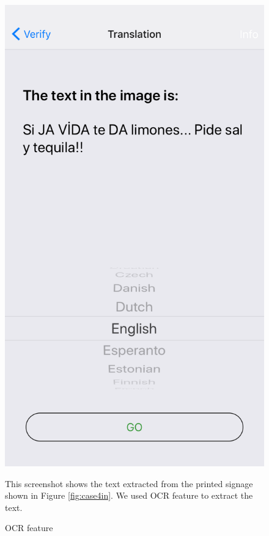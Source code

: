 \documentclass[12pt]{article}
\begin{document}
\begin{figure} [H]
\begin{minipage}{.5\textwidth}
  \includegraphics[width=0.9\linewidth]{media/case4a.png}
  \caption{OCR feature}{This screenshot shows the text extracted from the printed signage shown in Figure \ref{fig:case4in}. We used OCR feature to extract the text.}
  \label{fig:case4}
\end{minipage}
\end{figure}
\end{document}
